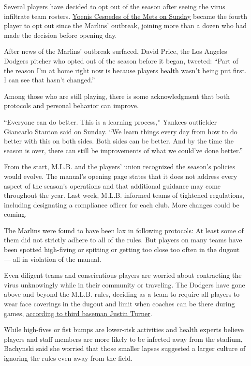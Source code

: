 Several players have decided to opt out of the season after seeing the
virus infiltrate team rosters.
\href{https://www.nytimes.com/2020/08/02/sports/baseball/Yoenis-cespedes-opt-out-rule.html}{Yoenis
Cespedes of the Mets on Sunday} became the fourth player to opt out
since the Marlins' outbreak, joining more than a dozen who had made the
decision before opening day.

After news of the Marlins' outbreak surfaced, David Price, the Los
Angeles Dodgers pitcher who opted out of the season before it began,
tweeted: ``Part of the reason I'm at home right now is because players
health wasn't being put first. I can see that hasn't changed.''

Among those who are still playing, there is some acknowledgment that
both protocols and personal behavior can improve.

``Everyone can do better. This is a learning process,'' Yankees
outfielder Giancarlo Stanton said on Sunday. ``We learn things every day
from how to do better with this on both sides. Both sides can be better.
And by the time the season is over, there can still be improvements of
what we could've done better.''

From the start, M.L.B. and the players' union recognized the season's
policies would evolve. The manual's opening page states that it does not
address every aspect of the season's operations and that additional
guidance may come throughout the year. Last week, M.L.B. informed teams
of tightened regulations, including designating a compliance officer for
each club. More changes could be coming.

The Marlins were found to have been lax in following protocols: At least
some of them did not strictly adhere to all of the rules. But players on
many teams have been spotted high-fiving or spitting or getting too
close too often in the dugout --- all in violation of the manual.

Even diligent teams and conscientious players are worried about
contracting the virus unknowingly while in their community or traveling.
The Dodgers have gone above and beyond the M.L.B. rules, deciding as a
team to require all players to wear face coverings in the dugout and
limit when coaches can be there during games,
\href{https://twitter.com/alannarizzo/status/1289371846425550848}{according
to third baseman Justin Turner}.

While high-fives or fist bumps are lower-risk activities and health
experts believe players and staff members are more likely to be infected
away from the stadium, Bachynski said she worried that those smaller
lapses suggested a larger culture of ignoring the rules even away from
the field.

